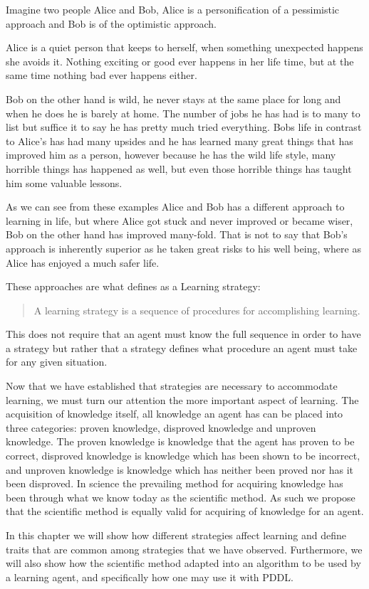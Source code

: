 \documentclass[../Master.tex]{subfiles}
\begin{document}
	\begin{example}
		Imagine two people Alice and Bob, Alice is a personification of a pessimistic approach and Bob is of the optimistic approach.
		
		Alice is a quiet person that keeps to herself, when something unexpected happens she avoids it. 
		Nothing exciting or good ever happens in her life time, but at the same time nothing bad ever happens either.
		
		Bob on the other hand is wild, he never stays at the same place for long and when he does he is barely at home. 
		The number of jobs he has had is to many to list but suffice it to say he has pretty much tried everything.
		Bobs life in contrast to Alice's has had many upsides and he has learned many great things that has improved him as a person,
		however because he has the wild life style, many horrible things has happened as well, but even those horrible things has taught him some valuable lessons.
		
		As we can see from these examples Alice and Bob has a different approach to learning in life, but where Alice got stuck and never improved or became wiser, 
		Bob on the other hand has improved many-fold. That is not to say that Bob's approach is inherently superior as he taken great risks to his well being, where as Alice has enjoyed a much safer life.
		
	\end{example}
	
	
	These approaches are what \cite{tobias1990a} defines as a Learning strategy:
	
\begin{quote}
	A learning strategy is a sequence of procedures for accomplishing learning.
\end{quote}
	
	This does not require that an agent must know the full sequence in order to have a strategy but rather that a strategy defines what procedure an agent must take for any given situation.

	Now that we have established that strategies are necessary to accommodate learning, we must turn our attention the more important aspect of learning. 
	The acquisition of knowledge itself, all knowledge an agent has can be placed into three categories: proven knowledge, disproved knowledge and unproven knowledge. 
	The proven knowledge is knowledge that the agent has proven to be correct, disproved knowledge is knowledge which has been shown to be incorrect, and unproven knowledge is knowledge which has neither been proved nor has it been disproved.
	In science the prevailing method for acquiring knowledge has been through what we know today as the scientific method. 
	As such we propose that the scientific method is equally valid for acquiring of knowledge for an agent.
	
	In this chapter we will show how different strategies affect learning and define traits that are common among strategies that we have observed. 
	Furthermore, we will also show how the scientific method adapted into an algorithm to be used by a learning agent, and specifically how one may use it with PDDL.
	
	
	
\end{document}
